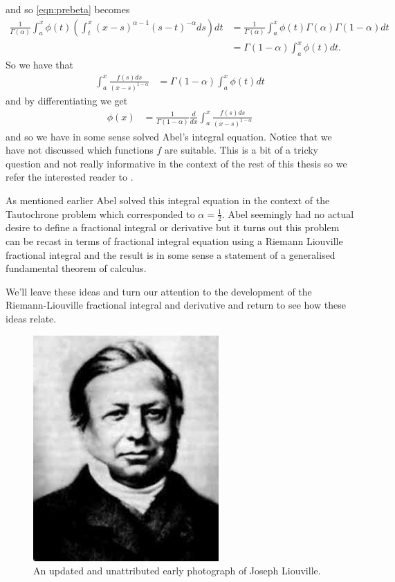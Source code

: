 and so \eqref{eqn:prebeta} becomes
\begin{align*}
	\frac{1}{\Gamma(\alpha)} \int_a^x \phi(t) \left( \int_t^x (x-s)^{\alpha-1}(s-t)^{-\alpha} ds\right) dt
		&= \frac{1}{\Gamma(\alpha)} \int_a^x \phi(t) \Gamma(\alpha)\Gamma(1-\alpha) dt \\
		&= \Gamma(1-\alpha)\int_a^x \phi(t) dt. 
\end{align*}
So we have that 
\begin{align*}
	\int_a^x \frac{f(s)ds}{(x-s)^{1-\alpha}} &= \Gamma(1-\alpha)\int_a^x \phi(t) dt
\end{align*}
and by differentiating we get
\begin{align*}
	\phi(x) &= \frac{1}{\Gamma(1-\alpha)} \frac{d}{dx} \int_a^x \frac{f(s)ds}{(x-s)^{1-\alpha}}
\end{align*}
and so we have in some sense solved Abel's integral equation. Notice that we have not discussed which functions $ f $ are suitable. This is a bit of a tricky question and not really informative in the context of the rest of this thesis so we refer the interested reader to \cite{Samko1993}. 

As mentioned earlier Abel solved this integral equation in the context of the Tautochrone problem which corresponded to $ \alpha = \frac{1}{2} $. Abel seemingly had no actual desire to define a fractional integral or derivative but it turns out this problem can be recast in terms of fractional integral equation using a Riemann Liouville fractional integral and the result is in some sense a statement of a generalised fundamental theorem of calculus. 

We'll leave these ideas and turn our attention to the development of the Riemann-Liouville fractional integral and derivative and return to see how these ideas relate.

\begin{figure}
    \includegraphics[scale=0.5]{images/Joseph_liouville}
    \caption{An updated and unattributed early photograph of Joseph Liouville.}
\end{figure}

